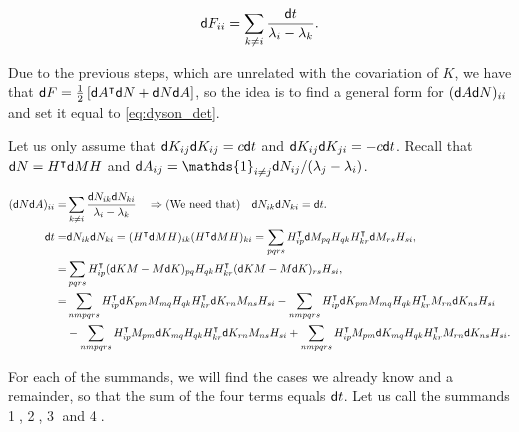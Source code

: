     \begin{equation} \label{eq:dyson_det}
        \mathsf d F_{ii} = \sum_{k\neq i} \frac{\mathsf d t}{\lambda_i - \lambda_k}.
    \end{equation} 

Due to the previous steps, which are unrelated with the covariation of $K$, we have that $\mathsf d F = \frac12\left[\mathsf d A^{\intercal}\mathsf d N + \mathsf d N\mathsf d A \right]$, so the idea is to find a general form for $(\mathsf d A\mathsf d N)_{ii}$ and set it equal to \eqref{eq:dyson_det}. 

Let us only assume that $\mathsf d K_{ij}\mathsf d K_{ij} = c\mathsf d t$ and $\mathsf d K_{ij}\mathsf d K_{ji} = - c\mathsf d t$. Recall that $\mathsf d N = H^{\intercal} \mathsf d M H$ and $\d A_{ij} = \mathds{1}_{i\neq j} \d N_{ij}/(\lambda_j - \lambda_i)$.


\begin{align*} 
     (\mathsf d N \mathsf d A)_{ii} =& \sum_{k\neq i} \frac{\mathsf d N_{ik} \mathsf d N_{ki}}{\lambda_i - \lambda_k} \quad \Rightarrow \text{(We need that)}\quad  \mathsf d N_{ik} \mathsf d N_{ki} = \mathsf d t. \\
     \mathsf d t =& \mathsf d N_{ik} \mathsf d N_{ki} = (H^{\intercal} \mathsf d M H)_{ik}(H^{\intercal}\mathsf d M H)_{ki} = \sum_{pqrs} H^{\intercal}_{ip} \mathsf d M_{pq} H_{qk} H^{\intercal}_{kr} \mathsf d M_{rs} H_{si},\\
     =& \sum_{pqrs} H^{\intercal}_{ip} (\mathsf d K M - M\mathsf d K)_{pq} H_{qk} H^{\intercal}_{kr} (\mathsf d K M - M\mathsf d K)_{rs} H_{si},\\
     =& \sum_{nmpqrs} H^{\intercal}_{ip}\mathsf d K_{pm} M_{mq} H_{qk} H^{\intercal}_{kr} \mathsf d K_{rn} M_{ns} H_{si} - \sum_{nmpqrs} H^{\intercal}_{ip}\mathsf d K_{pm} M_{mq} H_{qk} H^{\intercal}_{kr} M_{rn} \mathsf d K_{ns} H_{si}\\
     & - \sum_{nmpqrs} H^{\intercal}_{ip} M_{pm} \mathsf d K_{mq} H_{qk} H^{\intercal}_{kr} \mathsf d K_{rn} M_{ns} H_{si} + 
     \sum_{nmpqrs} H^{\intercal}_{ip} M_{pm} \mathsf d K_{mq} H_{qk} H^{\intercal}_{kr} M_{rn} \mathsf d K_{ns} H_{si}.
\end{align*}

For each of the summands, we will find the cases we already know and a remainder, so that the sum of the four terms equals $\mathsf d t$. Let us call the summands \textcircled{1}, \textcircled{2}, \textcircled{3} and \textcircled{4}. 

